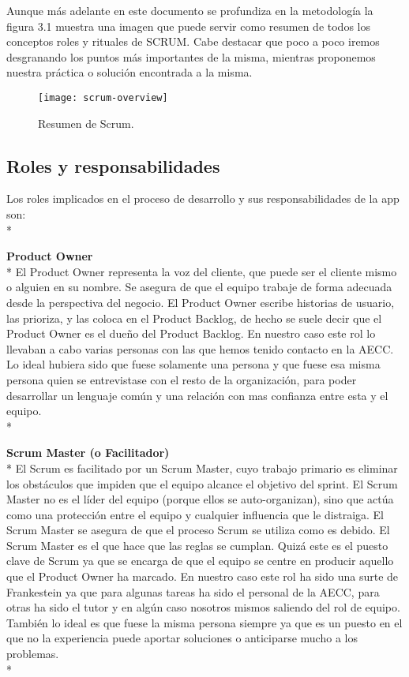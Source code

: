 \documentclass[../pfc.tex]{subfiles}
\begin{document}
	Aunque más adelante en este documento se profundiza en la metodología la figura 3.1 muestra una imagen que puede servir como resumen de todos los conceptos roles y rituales de SCRUM. Cabe destacar que poco a poco iremos desgranando los puntos más importantes de la misma, mientras proponemos nuestra práctica o solución encontrada a la misma.
	
		\begin{figure}[h]
			\centering
			\texttt{[image: scrum-overview]}
			\caption{Resumen de Scrum.}
			\label{fig:Resumen de Scrum}
		\end{figure}
	
	\subsection{Roles y responsabilidades}
	Los roles  implicados en el proceso de desarrollo y sus responsabilidades de la app son:\\*

	\textbf{Product Owner}\\*
	El Product Owner representa la voz del cliente, que puede ser el cliente mismo o alguien en su nombre. Se asegura de que el equipo trabaje de forma adecuada desde la perspectiva del negocio. El Product Owner escribe historias de usuario, las prioriza, y las coloca en el Product Backlog, de hecho se suele decir que el Product Owner es el dueño del Product Backlog. En nuestro caso este rol lo llevaban a cabo varias personas con las que hemos tenido contacto en la AECC. Lo ideal hubiera sido que fuese solamente una persona y que fuese esa misma persona quien se entrevistase con el resto de la organización, para poder desarrollar un lenguaje común y una relación con mas confianza entre esta y el equipo.\\*
	
	\textbf{Scrum Master (o Facilitador)}\\*
	El Scrum es facilitado por un Scrum Master, cuyo trabajo primario es eliminar los obstáculos que impiden que el equipo alcance el objetivo del sprint. El Scrum Master no es el líder del equipo (porque ellos se auto-organizan), sino que actúa como una protección entre el equipo y cualquier influencia que le distraiga. El Scrum Master se asegura de que el proceso Scrum se utiliza como es debido. El Scrum Master es el que hace que las reglas se cumplan. Quizá este es el puesto clave de Scrum ya que se encarga de que el equipo se centre en producir aquello que el Product Owner ha marcado. En nuestro caso este rol ha sido una surte de Frankestein ya que para algunas tareas ha sido el personal de la AECC, para otras ha sido el tutor y en algún caso nosotros mismos saliendo del rol de equipo. También lo ideal es que fuese la misma persona siempre ya que es un puesto en el que no la experiencia puede aportar soluciones o anticiparse mucho a los problemas.\\*
	
\end{document}
